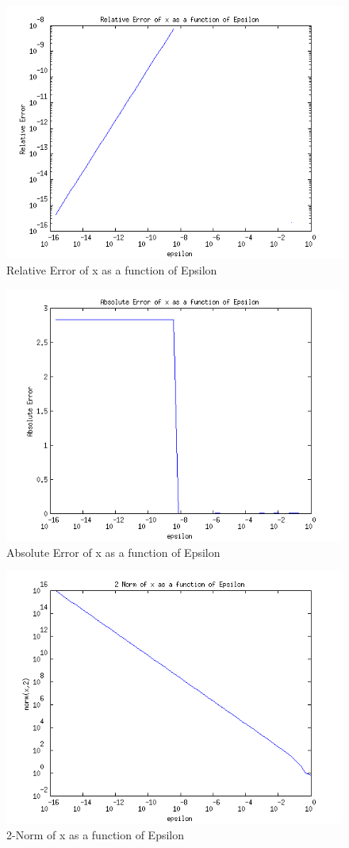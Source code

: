\documentclass{article}
\begin{document}
\begin{figure}
\centering
\includegraphics[width=1.0\textwidth]{plot2.png}
\caption{Relative Error of x as a function of Epsilon}
\label{plot2}
\end{figure}

\begin{figure}
\centering
\includegraphics[width=1.0\textwidth]{plot4.png}
\caption{Absolute Error of x as a function of Epsilon}
\label{plot4}
\end{figure}

\begin{figure}
\centering
\includegraphics[width=1.0\textwidth]{plot5.png}
\caption{2-Norm of x as a function of Epsilon}
\label{plot5}
\end{figure}
\end{document}
